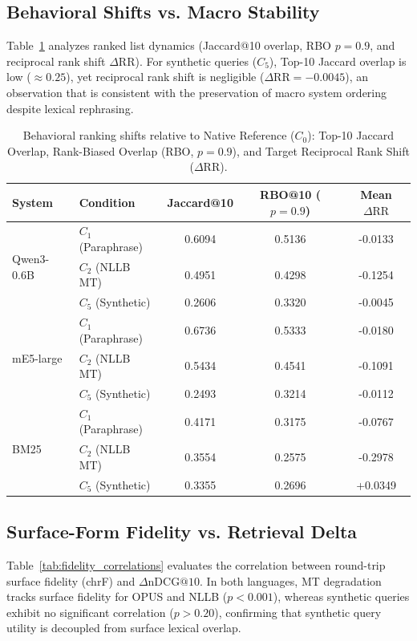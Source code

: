\documentclass[runningheads]{llncs}
\begin{document}
\subsection{Behavioral Shifts vs. Macro Stability}
Table~\ref{tab:behavioral_shifts} analyzes ranked list dynamics (Jaccard@10 overlap, RBO $p=0.9$, and reciprocal rank shift $\Delta\text{RR}$). For synthetic queries ($C_5$), Top-10 Jaccard overlap is low ($\approx 0.25$), yet reciprocal rank shift is negligible ($\Delta\text{RR} = -0.0045$), an observation that is consistent with the preservation of macro system ordering despite lexical rephrasing.

\begin{table}[t]
\centering
\caption{Behavioral ranking shifts relative to Native Reference ($C_0$): Top-10 Jaccard Overlap, Rank-Biased Overlap (RBO, $p=0.9$), and Target Reciprocal Rank Shift ($\Delta\text{RR}$).}
\label{tab:behavioral_shifts}
\begin{tabular}{llccc}
\toprule
\textbf{System} & \textbf{Condition} & \textbf{Jaccard@10} & \textbf{RBO@10 ($p=0.9$)} & \textbf{Mean $\Delta\text{RR}$} \\
\midrule
\multirow{3}{*}{Qwen3-0.6B} & $C_1$ (Paraphrase) & 0.6094 & 0.5136 & -0.0133 \\
& $C_2$ (NLLB MT) & 0.4951 & 0.4298 & -0.1254 \\
& $C_5$ (Synthetic) & 0.2606 & 0.3320 & -0.0045 \\
\midrule
\multirow{3}{*}{mE5-large} & $C_1$ (Paraphrase) & 0.6736 & 0.5333 & -0.0180 \\
& $C_2$ (NLLB MT) & 0.5434 & 0.4541 & -0.1091 \\
& $C_5$ (Synthetic) & 0.2493 & 0.3214 & -0.0112 \\
\midrule
\multirow{3}{*}{BM25} & $C_1$ (Paraphrase) & 0.4171 & 0.3175 & -0.0767 \\
& $C_2$ (NLLB MT) & 0.3554 & 0.2575 & -0.2978 \\
& $C_5$ (Synthetic) & 0.3355 & 0.2696 & +0.0349 \\
\bottomrule
\end{tabular}
\end{table}

\subsection{Surface-Form Fidelity vs. Retrieval Delta}
Table~\ref{tab:fidelity_correlations} evaluates the correlation between round-trip surface fidelity (chrF) and $\Delta\text{nDCG@10}$. In both languages, MT degradation tracks surface fidelity for OPUS and NLLB ($p < 0.001$), whereas synthetic queries exhibit no significant correlation ($p > 0.20$), confirming that synthetic query utility is decoupled from surface lexical overlap.
\end{document}

